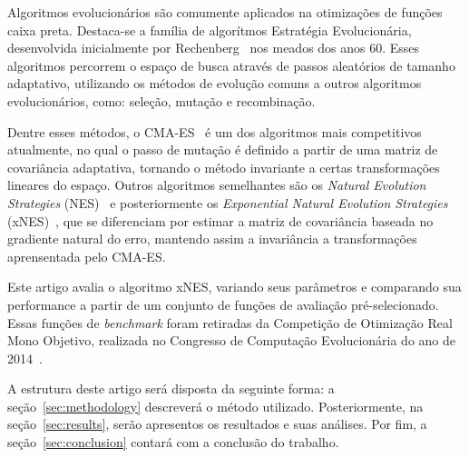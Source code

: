 Algoritmos evolucionários são comumente aplicados na otimizações de funções caixa preta.
Destaca-se a família de algorítmos Estratégia Evolucionária, desenvolvida inicialmente por Rechenberg~\cite{rechenberg65}
nos meados dos anos 60.
Esses algoritmos percorrem o espaço de busca através de passos aleatórios de tamanho adaptativo, utilizando os métodos de
evolução comuns a outros algoritmos evolucionários, como: seleção, mutação e recombinação.

Dentre esses métodos, o CMA-ES~\cite{hansen01} é um dos algoritmos mais competitivos atualmente, no qual o passo de
mutação é definido a partir de uma matriz de covariância adaptativa, tornando o método invariante a certas transformações
lineares do espaço.
Outros algoritmos semelhantes são os \textit{Natural Evolution Strategies} (NES)~\cite{wierstra08} e posteriormente
os \textit{Exponential Natural Evolution Strategies} (xNES)~\cite{glasmachers10}, que se diferenciam por estimar a matriz de
covariância baseada no gradiente natural do erro, mantendo assim a invariância a transformações aprensentada pelo CMA-ES.

Este artigo avalia o algoritmo xNES, variando seus parâmetros e comparando sua performance a partir de um conjunto de
funções de avaliação pré-selecionado.
Essas funções de \textit{benchmark} foram retiradas da Competição de Otimização Real Mono Objetivo, realizada no Congresso
de Computação Evolucionária do ano de 2014~\cite{liang13}.

A estrutura deste artigo será disposta da seguinte forma: a seção~\ref{sec:methodology} descreverá o método utilizado.
Posteriormente, na seção~\ref{sec:results}, serão apresentos os resultados e suas análises. Por fim, a
seção~\ref{sec:conclusion} contará com a conclusão do trabalho.
